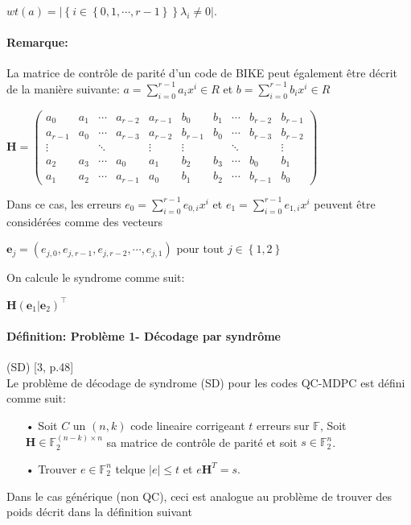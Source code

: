 \documentclass[12pt,openany]{report}
\begin{document}
\begin{center}
$ wt(a)=|\left\lbrace i\in \left\lbrace    0,1,\cdots,r-1\right\rbrace  \right\rbrace  \lambda_i \neq 0  |$.
\end{center}
\paragraph{Remarque:}
La matrice de contrôle de parité d'un code de BIKE peut également être décrit de la manière suivante:
$a=\sum_{i=0}^{r-1}a_i x^i \in \mathit{R} $ et
$b=\sum_{i=0}^{r-1}b_i x^i \in \mathit{R} $ 
\begin{center}
$\mathbf{H}=
\begin{pmatrix}
a_0 & a_1 & \cdots&a_{r-2}&a_{r-1} & b_0 & b_1 & \cdots&b_{r-2}&b_{r-1}  \\
a_{r-1} & a_0 & \cdots&a_{r-3}&a_{r-2} & b_{r-1} & b_0 & \cdots&b_{r-3}&b_{r-2}\\
\vdots  &      &\ddots&       &\vdots & \vdots  &      &\ddots&       &\vdots\\
a_2     &a_3   &\cdots &a_0&a_1 & b_2     &b_3   &\cdots &b_0&b_1\\
a_1&    a_2    &\cdots &a_{r-1}& a_0 & b_1&    b_2    &\cdots &b_{r-1}& b_0
\end{pmatrix} $

\end{center}
 Dans ce cas, les erreurs $e_0=\sum_{i=0}^{r-1}e_{0,i} x^i $ et $e_1=\sum_{i=0}^{r-1}e_{1,i} x^i $ peuvent être considérées comme des vecteurs
 
 \begin{center}
 $ \mathbf{e}_j=(e_{j,0},e_{j,r-1},e_{j,r-2},\cdots,e_{j,1})$\hspace{0.2cm} pour tout $ j \in \left\lbrace 1,2 \right\rbrace $
 \end{center}
 
 On calcule le syndrome comme suit:
 
 \begin{center}
 $
 \mathbf{H}(\mathbf{e}_1| \mathbf{e}_2)^{\top}
 $
\end{center}  
 
 \paragraph{Définition: Problème 1- Décodage par syndrôme} (SD) [3, p.48]\\
 Le problème de décodage de syndrome (SD) pour les codes QC-MDPC est défini comme suit:
 \begin{itemize}
 \item[•] Soit $\mathit{C} $ un $(n,k)$ code lineaire corrigeant $t$ erreurs sur 
 $ \mathbb{F}$, Soit $\mathbf{H} \in \mathbb{F}_2^{(n-k)\times n}$ sa matrice de contrôle de parité et soit $ s \in \mathbb{F}_2^n$.
 \item[•] Trouver $ e \in \mathbb{F}_2^n $ telque $ \mid e \mid \leq t$ et $ e\mathbf{H}^T = s $.
 \end{itemize}
 Dans le cas générique (non QC), ceci est analogue au problème de trouver des poids
décrit dans la définition suivant\\
\end{document}
